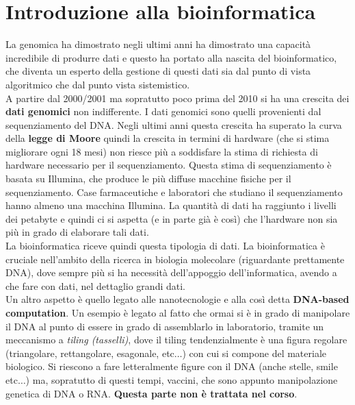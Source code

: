 \documentclass[a4paper,12pt, oneside]{book}
\begin{document}
\chapter{Introduzione alla bioinformatica}
La genomica ha dimostrato negli ultimi anni ha dimostrato una capacità
incredibile di produrre dati e questo ha portato alla nascita del
bioinformatico, che diventa un esperto della gestione di questi dati sia dal
punto di vista algoritmico che dal punto vista sistemistico.\\
A partire dal 2000/2001 ma sopratutto poco prima del 2010 si ha una crescita dei
\textbf{dati genomici} non indifferente. I dati genomici sono quelli provenienti
dal sequenziamento del DNA. Negli ultimi anni questa crescita ha superato la
curva della \textbf{legge di Moore} quindi la crescita in termini di hardware
(che si stima migliorare ogni 18 mesi) non riesce più a soddisfare la stima di
richiesta di hardware necessario per il sequenziamento. Questa stima di
sequenziamento è basata su Illumina, che produce le più diffuse macchine fisiche
per il sequenziamento. Case farmaceutiche e laboratori che studiano il
sequenziamento hanno almeno una macchina Illumina. La quantità di dati ha
raggiunto i livelli dei petabyte e quindi ci si aspetta (e in parte già è così)
che l'hardware non sia più in grado di elaborare tali dati.\\
La bioinformatica riceve quindi questa tipologia di dati. La bioinformatica è
cruciale nell'ambito della ricerca in biologia molecolare (riguardante
prettamente DNA), dove sempre più si ha necessità dell'appoggio
dell'informatica, avendo a che fare con dati, nel dettaglio grandi dati.\\
Un altro aspetto è quello legato alle nanotecnologie e alla così detta
\textbf{DNA-based computation}. Un esempio è legato al fatto che ormai si è in
grado di manipolare il DNA al punto di essere in grado di assemblarlo in
laboratorio, tramite un meccanismo a \textit{tiling (tasselli)}, dove il tiling
tendenzialmente è una figura regolare (triangolare, rettangolare, esagonale,
etc$\ldots$) con cui si compone del materiale biologico. Si riescono a fare
letteralmente figure con il DNA (anche stelle, smile etc$\ldots$) ma, sopratutto
di questi tempi, vaccini, che sono appunto manipolazione genetica di DNA o
RNA. \textbf{Questa parte non è trattata nel corso}.
\end{document}
